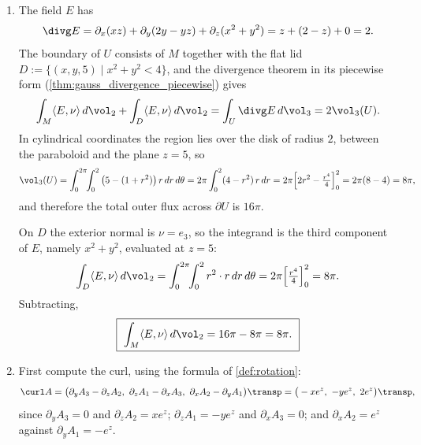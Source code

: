 \begin{exercisesolution}
\begin{enumerate}[label=\textbf{(\alph*)}]
\begin{center}
\end{center}

  \item The field $E$ has
    \[\divg E = \partial_x(xz) + \partial_y(2y-yz) + \partial_z(x^2+y^2) = z + (2-z) + 0 = 2 .\]
    The boundary of $U$ consists of $M$ together with the flat lid
    $D := \{(x,y,5) \mid x^2+y^2 < 4\}$, and the divergence theorem in its piecewise form
    (\cref{thm:gauss_divergence_piecewise}) gives
    \[\int_M \langle E,\nu\rangle\,d\vol_2 + \int_D \langle E,\nu\rangle\,d\vol_2
      = \int_U \divg E\,d\vol_3 = 2\vol_3(U).\]
    In cylindrical coordinates the region lies over the disk of radius $2$, between the paraboloid
    and the plane $z=5$, so
    \[\vol_3(U) = \int_0^{2\pi}\!\!\int_0^2 \big(5 - (1+r^2)\big)\,r\,dr\,d\theta
      = 2\pi\int_0^2 (4-r^2)\,r\,dr = 2\pi\Big[2r^2 - \tfrac{r^4}{4}\Big]_0^2
      = 2\pi(8-4) = 8\pi,\]
    and therefore the total outer flux across $\partial U$ is $16\pi$.

    On $D$ the exterior normal is $\nu = e_3$, so the integrand is the third component of $E$,
    namely $x^2+y^2$, evaluated at $z=5$:
    \[\int_D \langle E,\nu\rangle\,d\vol_2 = \int_0^{2\pi}\!\!\int_0^2 r^2\cdot r\,dr\,d\theta
      = 2\pi\Big[\tfrac{r^4}{4}\Big]_0^2 = 8\pi .\]
    Subtracting,
    \[\boxed{\ \int_M \langle E,\nu\rangle\,d\vol_2 = 16\pi - 8\pi = 8\pi.\ }\]

  \item First compute the curl, using the formula of \cref{def:rotation}:
    \[\curl A = \big(\partial_yA_3 - \partial_zA_2,\ \partial_zA_1 - \partial_xA_3,\
      \partial_xA_2 - \partial_yA_1\big)\transp
      = \big(-xe^z,\ -ye^z,\ 2e^z\big)\transp,\]
    since $\partial_yA_3 = 0$ and $\partial_zA_2 = xe^z$; $\partial_zA_1 = -ye^z$ and
    $\partial_xA_3 = 0$; and $\partial_xA_2 = e^z$ against $\partial_yA_1 = -e^z$.


\end{enumerate}
\end{exercisesolution}
